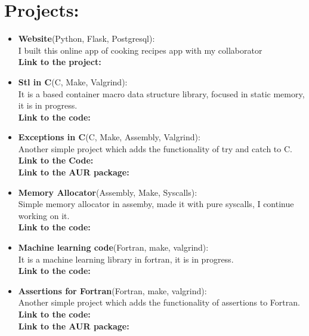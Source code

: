 \documentclass{article}
\begin{document}
\begin{minipage}[t]{8cm}
  \vspace*{-2cm}
  
\section*{Projects:}
\begin{itemize}
  \setlength\itemsep{0.01cm}
\item \textbf{Website}(Python, Flask, Postgresql):\\
  I built this online app of cooking recipes app with my collaborator
  \href{https://github.com/Experthor}{\color{blue}{Experthor}}\\
  \textbf{Link to the project:} \href{https://github.com/alecksandr26/recipe-app-web}{\color{Blue}{Github}}
\item \textbf{Stl in C}(C, Make, Valgrind):\\
  It is a based container macro data structure library, focused in static memory, it is in progress.\\
  \textbf{Link to the code:} \href{https://github.com/alecksandr26/stl-c}{\color{Blue}{GitHub}}
\item \textbf{Exceptions in C}(C, Make, Assembly, Valgrind): \\
  Another simple project which adds the functionality of try and catch to C.\\
  \textbf{Link to the Code:} \href{https://github.com/alecksandr26/c-exceptions}{\color{Blue}{GitHub}}\\
  \textbf{Link to the AUR package:} \href{https://aur.archlinux.org/packages/c-exceptions}{\color{Blue}{AUR}}
\item \textbf{Memory Allocator}(Assembly, Make, Syscalls):\\
  Simple memory allocator in assemby, made it with pure syscalls, I continue working on it.\\
  \textbf{Link to the code:} \href{https://github.com/alecksandr26/memory-allocator}{\color{Blue}{GitHub}}
\item \textbf{Machine learning code}(Fortran, make, valgrind):\\
  It is a machine learning library in fortran, it is in progress.\\
  \textbf{Link to the code:} \href{https://github.com/alecksandr26/machine-learning-code}{\color{Blue}{GitHub}}
\item \textbf{Assertions for Fortran}(Fortran, make, valgrind):\\
  Another simple project which adds the functionality of assertions to Fortran.\\
  \textbf{Link to the code:} \href{https://github.com/alecksandr26/assert-fortran}{\color{Blue}{GitHub}}\\
  \textbf{Link to the AUR package:}
  \href{https://aur.archlinux.org/packages/assert-fortran-git}{\color{Blue}{AUR}}
\end{itemize}


\end{minipage}
\end{document}
